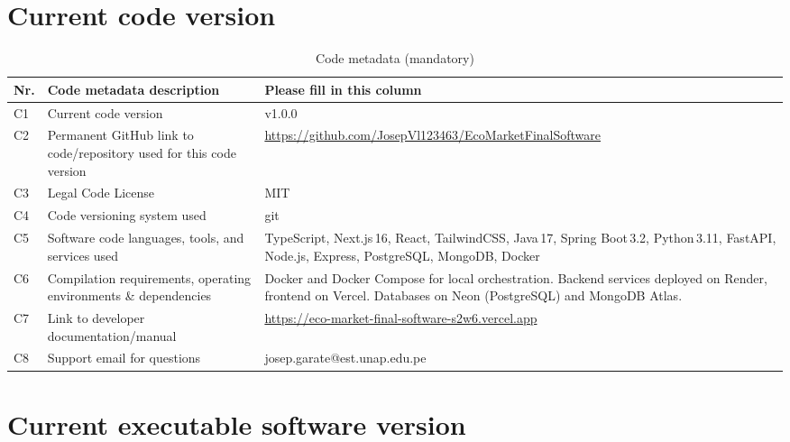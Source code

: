 \documentclass[preprint,12pt,a4paper]{elsarticle}
\begin{document}
\section*{Current code version}

\begin{table}[!h]
\begin{tabular}{|l|p{5.8cm}|p{6.5cm}|}
\hline
\textbf{Nr.} & \textbf{Code metadata description} & \textbf{Please fill in this column} \\
\hline
C1 & Current code version & v1.0.0 \\
\hline
C2 & Permanent GitHub link to code/repository used for this code version &
     \url{https://github.com/JosepVl123463/EcoMarketFinalSoftware} \\
\hline
C3 & Legal Code License & MIT \\
\hline
C4 & Code versioning system used & git \\
\hline
C5 & Software code languages, tools, and services used &
     TypeScript, Next.js\,16, React, TailwindCSS, Java\,17, Spring Boot\,3.2, Python\,3.11, FastAPI, Node.js, Express, PostgreSQL, MongoDB, Docker \\
\hline
C6 & Compilation requirements, operating environments \& dependencies &
     Docker and Docker Compose for local orchestration. Backend services deployed on Render, frontend on Vercel. Databases on Neon (PostgreSQL) and MongoDB Atlas. \\
\hline
C7 & Link to developer documentation/manual &
     \url{https://eco-market-final-software-s2w6.vercel.app} \\
\hline
C8 & Support email for questions & josep.garate@est.unap.edu.pe \\
\hline
\end{tabular}
\caption{Code metadata (mandatory)}
\label{tab:code-metadata}
\end{table}

\section*{Current executable software version}
\end{document}
